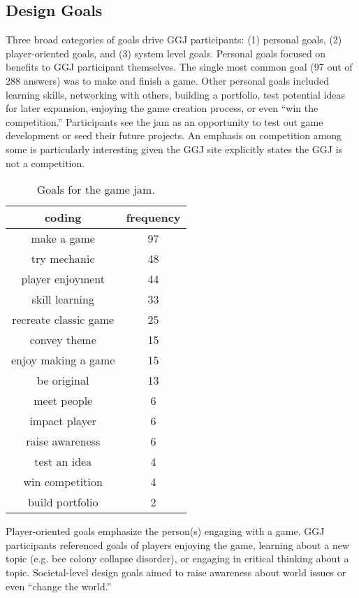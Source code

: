 \documentclass{sig-alternate}
\begin{document}
\subsection{Design Goals}
Three broad categories of goals drive GGJ participants: (1) personal goals, (2) player-oriented goals, and (3) system level goals.
Personal goals focused on benefits to GGJ participant themselves. 
The single most common goal (97 out of 288 answers) was to make and finish a game. 
Other personal goals included learning skills, networking with others, building a portfolio, test potential ideas for later expansion, enjoying the game creation process, or even ``win the competition.'' 
Participants see the jam as an opportunity to test out game development or seed their future projects.
An emphasis on competition among some is particularly interesting given the GGJ site explicitly states the GGJ is not a competition. %

\begin{table}[tb]
\centering
\scriptsize
\begin{tabular}{|c|c|}
\hline coding & frequency \\ 
\hline make a game & 97 \\ 
\hline try mechanic & 48 \\ 
\hline player enjoyment & 44 \\ 
\hline skill learning & 33 \\ 
\hline recreate classic game & 25 \\ 
\hline convey theme & 15 \\ 
\hline enjoy making a game & 15 \\ 
\hline be original & 13 \\ 
\hline meet people & 6 \\ 
\hline impact player & 6 \\ 
\hline raise awareness & 6 \\ 
\hline test an idea & 4 \\ 
\hline win competition & 4 \\ 
\hline build portfolio & 2 \\ 
\hline 
\end{tabular} 
\caption{Goals for the game jam.}
\label{tab:goals}
\end{table}

Player-oriented goals emphasize the person(s) engaging with a game.
GGJ participants referenced goals of players enjoying the game, learning about a new topic (e.g. bee colony collapse disorder), or engaging in critical thinking about a topic. Societal-level design goals aimed to raise awareness about world issues or even ``change the world.''
\end{document}
